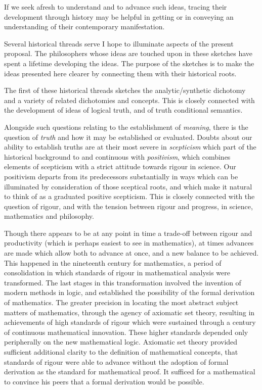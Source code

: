 If we seek afresh to understand and to advance such ideas, tracing
their development through history may be helpful in getting or in
conveying an understanding of their contemporary manifestation.

Several historical threads serve I hope to illuminate aspects of the
present proposal.
The philosophers whose ideas are touched upon in these sketches have
spent a lifetime developing the ideas.
The purpose of the sketches is to make the ideas presented here
clearer by connecting them with their historical roots.

The first of these historical threads sketches the analytic/synthetic
dichotomy and a variety of related dichotomies and concepts.
This is closely connected with the development of ideas of logical
truth, and of truth conditional semantics.

Alongside such questions relating to the establishment of
{\it meaning}, there is the question of {\it truth} and how it may
be established or evaluated.
Doubts about our ability to establish truths are at their most severe
in {\it scepticism} which part of the historical background to and
continuous with {\it positivism}, which combines elements of
scepticism with a strict attitude towards rigour in science.
Our positivism departs from its predecessors substantially in ways
which can be illuminated by consideration of those sceptical roots,
and which make it natural to think of as a graduated positive
scepticism.
This is closely connected with the question of rigour, and with the
tension between rigour and progress, in science, mathematics and
philosophy.

Though there appears to be at any point in time a trade-off between
rigour and productivity (which is perhaps easiest to see in
mathematics), at times advances are made which allow both to advance
at once, and a new balance to be achieved.
This happened in the nineteenth century for mathematics, a period of
consolidation in which standards of rigour in mathematical analysis
were transformed.
The last stages in this transformation involved the invention of
modern methods in logic, and established the possibility of the formal
derivation of mathematics.
The greater precision in locating the most abstract subject matters of
mathematics, through the agency of axiomatic set theory, resulting in
achievements of high standards of rigour which were sustained through
a century of continuous mathematical innovation.
These higher standards depended only peripherally on the new
mathematical logic.
Axiomatic set theory provided sufficient additional clarity to the
definition of mathematical concepts, that standards of rigour were
able to advance without the adoption of formal derivation as the
standard for mathematical proof.
It sufficed for a mathematical to convince his peers that a formal
derivation would be possible.

